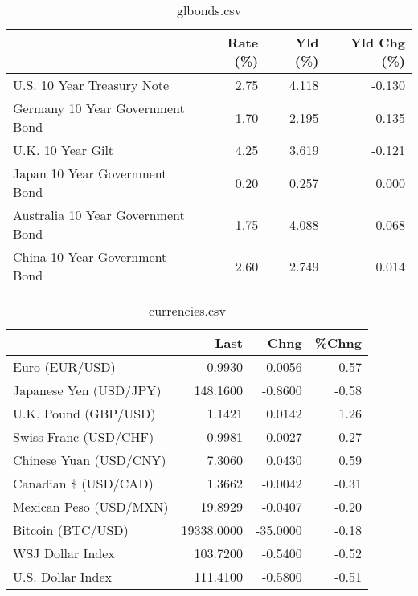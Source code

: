 \documentclass{article}%
\begin{document}
%


\begin{table}[htbp]%
\caption{glbonds.csv}%
\centering%
\begin{adjustbox}{width=1\textwidth}%
\begin{tabular}{lrrr}
\toprule
                                  &  Rate (\%) &  Yld (\%) &  Yld Chg (\%) \\
\midrule
       U.S. 10 Year Treasury Note &      2.75 &    4.118 &       -0.130 \\
  Germany 10 Year Government Bond &      1.70 &    2.195 &       -0.135 \\
                U.K. 10 Year Gilt &      4.25 &    3.619 &       -0.121 \\
    Japan 10 Year Government Bond &      0.20 &    0.257 &        0.000 \\
Australia 10 Year Government Bond &      1.75 &    4.088 &       -0.068 \\
    China 10 Year Government Bond &      2.60 &    2.749 &        0.014 \\
\bottomrule
\end{tabular}
%
\end{adjustbox}%
\end{table}

%


\begin{table}[htbp]%
\caption{currencies.csv}%
\centering%
\begin{adjustbox}{width=1\textwidth}%
\begin{tabular}{lrrr}
\toprule
                       &       Last &     Chng &  \%Chng \\
\midrule
        Euro (EUR/USD) &     0.9930 &   0.0056 &   0.57 \\
Japanese Yen (USD/JPY) &   148.1600 &  -0.8600 &  -0.58 \\
  U.K. Pound (GBP/USD) &     1.1421 &   0.0142 &   1.26 \\
 Swiss Franc (USD/CHF) &     0.9981 &  -0.0027 &  -0.27 \\
Chinese Yuan (USD/CNY) &     7.3060 &   0.0430 &   0.59 \\
  Canadian \$ (USD/CAD) &     1.3662 &  -0.0042 &  -0.31 \\
Mexican Peso (USD/MXN) &    19.8929 &  -0.0407 &  -0.20 \\
     Bitcoin (BTC/USD) & 19338.0000 & -35.0000 &  -0.18 \\
      WSJ Dollar Index &   103.7200 &  -0.5400 &  -0.52 \\
     U.S. Dollar Index &   111.4100 &  -0.5800 &  -0.51 \\
\bottomrule
\end{tabular}
%
\end{adjustbox}%
\end{table}

%
\end{document}
